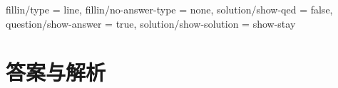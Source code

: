 
\examsetup
{
    fillin/type = line,
    fillin/no-answer-type = none,
    solution/show-qed = false,
    question/show-answer = true,
    solution/show-solution = show-stay
}

\chapter{答案与解析}
